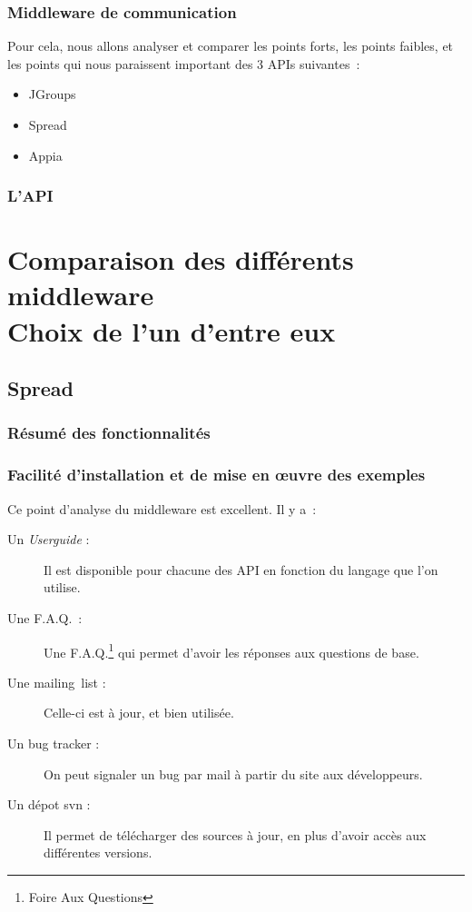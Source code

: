 \documentclass[a4paper,10pt]{report}
\begin{document}
\section{Middleware de communication}

Pour cela, nous allons analyser et comparer les points forts, les points faibles, et les points qui nous paraissent important des 3 APIs suivantes~:
\begin{itemize}
  \item JGroups~\cite{jgroup}
  \item Spread~\cite{spread}
  \item Appia~\cite{appia}
\end{itemize}


\section{L'API}

\part{Comparaison des différents middleware \\ Choix de l'un d'entre eux}

\chapter{Spread}

\section{Résumé des fonctionnalités}

\section{Facilité d'installation et de mise en œuvre des exemples}

Ce point d'analyse du middleware est excellent. Il y a~:
\begin{description}
  \item[Un \emph{Userguide} :] Il est disponible pour chacune des API en fonction du langage que l'on utilise.
  \item[Une F.A.Q.~:] Une F.A.Q.\footnote{Foire Aux Questions} qui permet d'avoir les réponses aux questions de base.
  \item[Une mailing~list :] Celle-ci est à jour, et bien utilisée.
  \item[Un bug tracker :] On peut signaler un bug par mail à partir du site aux développeurs.
  \item[Un dépot svn :] Il permet de télécharger des sources à jour, en plus d'avoir accès aux différentes versions.
\end{description}
\end{document}
